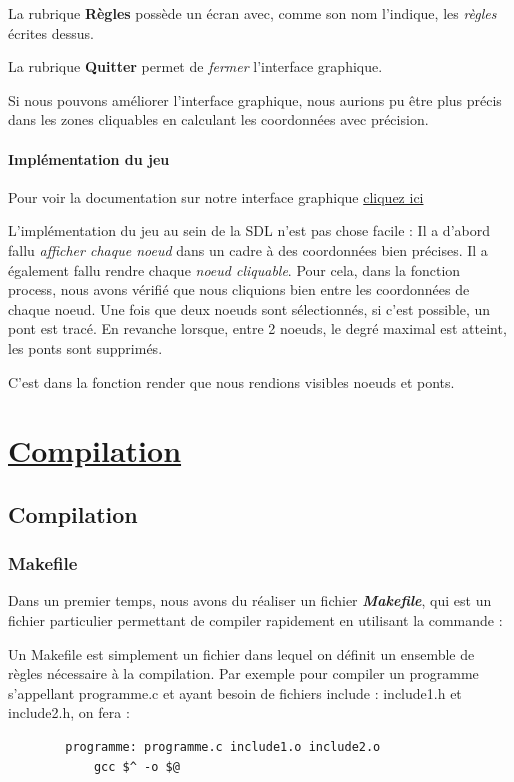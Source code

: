 \documentclass[12]{report}
\begin{document}
                La rubrique \textbf{Règles} possède un écran avec, comme son nom l'indique, les \emph{règles} écrites dessus.

                La rubrique \textbf{Quitter} permet de \emph{fermer} l'interface graphique.

                Si nous pouvons améliorer l'interface graphique, nous aurions pu être plus précis dans les zones cliquables en calculant les coordonnées avec précision.


		\subsection{Implémentation du jeu}

		Pour voir la documentation sur notre interface graphique \href{run:documentation.pdf}{cliquez ici} %

		L'implémentation du jeu au sein de la SDL n'est pas chose facile : Il a d'abord fallu \emph{afficher chaque noeud} dans un cadre à des coordonnées bien précises.
		Il a également fallu rendre chaque \emph{noeud cliquable}. Pour cela, dans la fonction process, nous avons vérifié que nous cliquions bien entre les coordonnées de chaque noeud. Une fois que deux noeuds sont sélectionnés, si c'est possible, un pont est tracé. En revanche lorsque, entre 2 noeuds, le degré maximal est atteint, les ponts sont supprimés.

		C'est dans la fonction render que nous rendions visibles noeuds et ponts.
\part{\underline{Compilation}}
	\chapter{Compilation}
		\section{Makefile}
		Dans un premier temps, nous avons du réaliser un fichier \textbf{\emph{Makefile}},
		qui est un fichier particulier permettant de compiler rapidement en utilisant la commande : 

		Un Makefile est simplement un fichier dans lequel on définit un ensemble de règles nécessaire à la compilation.
		Par exemple pour compiler un programme s'appellant programme.c et ayant besoin de fichiers include : include1.h et include2.h, on fera :
		\begin{lstlisting}
		programme: programme.c include1.o include2.o
			gcc $^ -o $@
		\end{lstlisting}
\end{document}
